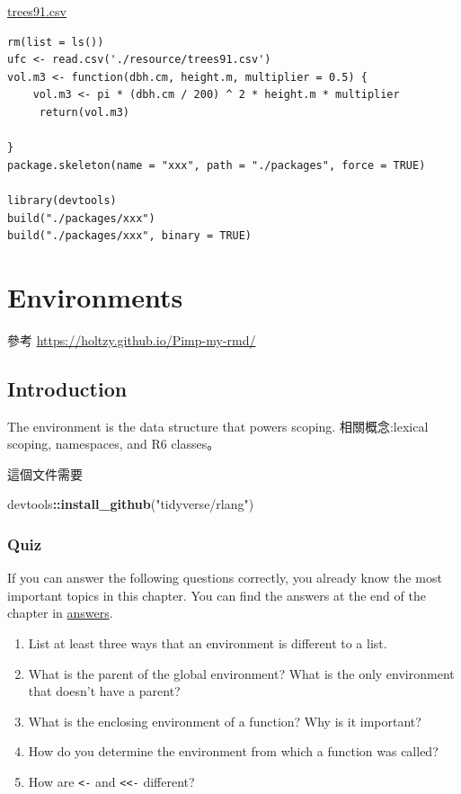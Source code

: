 \documentclass[]{book}
\newenvironment{Shaded}{\begin{snugshade}}{\end{snugshade}}
\newcommand{\KeywordTok}[1]{\textcolor[rgb]{0.13,0.29,0.53}{\textbf{#1}}}
\newcommand{\NormalTok}[1]{#1}
\newcommand{\OperatorTok}[1]{\textcolor[rgb]{0.81,0.36,0.00}{\textbf{#1}}}
\newcommand{\StringTok}[1]{\textcolor[rgb]{0.31,0.60,0.02}{#1}}
\theoremstyle{definition}
\theoremstyle{definition}
\theoremstyle{definition}
\theoremstyle{remark}
\begin{document}
\href{./resources/trees91.csv}{trees91.csv}

\begin{verbatim}
rm(list = ls())
ufc <- read.csv('./resource/trees91.csv')
vol.m3 <- function(dbh.cm, height.m, multiplier = 0.5) {
    vol.m3 <- pi * (dbh.cm / 200) ^ 2 * height.m * multiplier
     return(vol.m3)
    
}
package.skeleton(name = "xxx", path = "./packages", force = TRUE)

library(devtools)
build("./packages/xxx")
build("./packages/xxx", binary = TRUE)
\end{verbatim}

\hypertarget{environments}{%
\chapter{Environments}\label{environments}}

參考 \url{https://holtzy.github.io/Pimp-my-rmd/}

\hypertarget{introduction-1}{%
\section{Introduction}\label{introduction-1}}

The environment is the data structure that powers scoping.
相關概念:lexical scoping, namespaces, and R6 classes。

這個文件需要

\begin{Shaded}
\begin{Highlighting}[]
\NormalTok{devtools}\OperatorTok{::}\KeywordTok{install_github}\NormalTok{(}\StringTok{"tidyverse/rlang"}\NormalTok{)}
\end{Highlighting}
\end{Shaded}

\hypertarget{quiz}{%
\subsection*{Quiz}\label{quiz}}

If you can answer the following questions correctly, you already know
the most important topics in this chapter. You can find the answers at
the end of the chapter in \protect\hyperlink{env-answers}{answers}.

\begin{enumerate}
\def\labelenumi{\arabic{enumi}.}
\item
  List at least three ways that an environment is different to a list.
\item
  What is the parent of the global environment? What is the only
  environment that doesn't have a parent?
\item
  What is the enclosing environment of a function? Why is it important?
\item
  How do you determine the environment from which a function was called?
\item
  How are \texttt{\textless{}-} and \texttt{\textless{}\textless{}-}
  different?
\end{enumerate}
\end{document}
